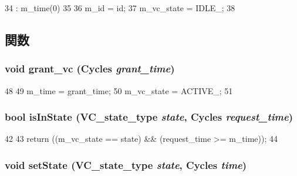 \begin{DoxyCode}
34     : m_time(0)
35 {
36     m_id = id;
37     m_vc_state = IDLE_;
38 }
\end{DoxyCode}


\subsection{関数}
\hypertarget{classOutVcState_ad463b42fe5ba1c0517ab0686facec633}{
\subsubsection[{grant\_\-vc}]{\setlength{\rightskip}{0pt plus 5cm}void grant\_\-vc ({\bf Cycles} {\em grant\_\-time})}}
\label{classOutVcState_ad463b42fe5ba1c0517ab0686facec633}



\begin{DoxyCode}
48 {
49     m_time = grant_time;
50     m_vc_state = ACTIVE_;
51 }
\end{DoxyCode}
\hypertarget{classOutVcState_ac76622b1411a4bb60ccc5ed355bc9645}{
\subsubsection[{isInState}]{\setlength{\rightskip}{0pt plus 5cm}bool isInState ({\bf VC\_\-state\_\-type} {\em state}, \/  {\bf Cycles} {\em request\_\-time})}}
\label{classOutVcState_ac76622b1411a4bb60ccc5ed355bc9645}



\begin{DoxyCode}
42 {
43     return ((m_vc_state == state) && (request_time >= m_time));
44 }
\end{DoxyCode}
\hypertarget{classOutVcState_a4ac4ce58e7eac1aee69c9891552538ec}{
\subsubsection[{setState}]{\setlength{\rightskip}{0pt plus 5cm}void setState ({\bf VC\_\-state\_\-type} {\em state}, \/  {\bf Cycles} {\em time})}}
\label{classOutVcState_a4ac4ce58e7eac1aee69c9891552538ec}



